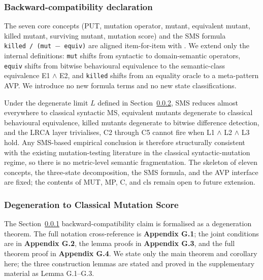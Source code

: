 \documentclass[manuscript,screen,review]{acmart}
\begin{document}
\subsubsection{Backward-compatibility declaration}\label{backward-compatibility-declaration}

The seven core concepts (PUT, mutation operator, mutant, equivalent
mutant, killed mutant, surviving mutant, mutation score) and the SMS
formula
\texttt{\textbar{}killed\textbar{}\ /\ (\textbar{}mut\textbar{}\ $-$\ \textbar{}equiv\textbar{})}
are aligned item-for-item with \citet{jia2011analysis}. We extend only the
internal definitions: \texttt{mut} shifts from syntactic to
domain-semantic operators, \texttt{equiv} shifts from bitwise
behavioural equivalence to the semantic-class equivalence E1 $\wedge$ E2, and
\texttt{killed} shifts from an equality oracle to a meta-pattern AVP. We
introduce no new formula terms and no new state classifications.

Under the degenerate limit $L$ defined in Section~\ref{sms-ms-degeneration-formal-statement}, SMS reduces
almost everywhere to classical syntactic MS, equivalent mutants
degenerate to classical behavioural equivalence, killed mutants
degenerate to bitwise difference detection, and the LRCA layer
trivialises, C2 through C5 cannot fire when L1 $\wedge$ L2 $\wedge$ L3 hold. Any
SMS-based empirical conclusion is therefore structurally consistent with
the existing mutation-testing literature in the classical
syntactic-mutation regime, so there is no metric-level semantic
fragmentation. The skeleton of eleven concepts, the three-state
decomposition, the SMS formula, and the AVP interface are fixed; the
contents of MUT, MP, C, and $\mathrm{cls}$ remain open to future
extension.

\subsubsection{Degeneration to Classical Mutation Score}\label{sms-ms-degeneration-formal-statement}

The Section~\ref{backward-compatibility-declaration} backward-compatibility claim is formalised as a degeneration
theorem. The full notation cross-reference is \textbf{Appendix G.1}; the joint
conditions are in \textbf{Appendix G.2}, the lemma proofs in
\textbf{Appendix G.3}, and the full theorem proof in \textbf{Appendix G.4}. We
state only the main theorem and corollary here; the three construction
lemmas are stated and proved in the supplementary material as
Lemma G.1--G.3.
\end{document}
